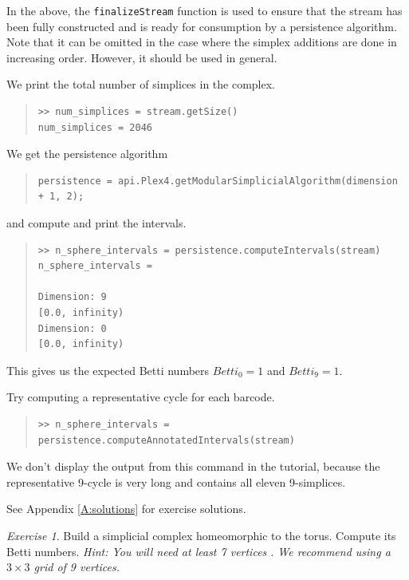 \documentclass[amscd, amssymb, verbatim]{amsart}[12pt]
\theoremstyle{remark}
\newtheorem{exercise}{Exercise}
\theoremstyle{remark}
\theoremstyle{remark}
\begin{document}
In the above, the \texttt{finalizeStream} function is used to ensure that the stream has been fully constructed and is ready for consumption by a persistence algorithm. Note that it can be omitted in the case where the simplex additions are done in increasing order. However, it should be used in general. 

We print the total number of simplices in the complex.

\begin{quote} \begin{verbatim}
>> num_simplices = stream.getSize()
num_simplices = 2046
\end{verbatim} \end{quote}

We get the persistence algorithm

\begin{quote} \begin{verbatim}
persistence = api.Plex4.getModularSimplicialAlgorithm(dimension + 1, 2);
\end{verbatim} \end{quote}

and compute and print the intervals.

\begin{quote} \begin{verbatim}
>> n_sphere_intervals = persistence.computeIntervals(stream)
n_sphere_intervals =

Dimension: 9
[0.0, infinity)
Dimension: 0
[0.0, infinity)
\end{verbatim} \end{quote}

This gives us the expected Betti numbers $Betti_0=1$ and $Betti_9=1$.

Try computing a representative cycle for each barcode.

\begin{quote} \begin{verbatim}
>> n_sphere_intervals = persistence.computeAnnotatedIntervals(stream)
\end{verbatim} \end{quote}

We don't display the output from this command in the tutorial, because the representative 9-cycle is very long and contains all eleven 9-simplices.

See Appendix \ref{A:solutions} for exercise solutions. 

\begin{exercise}
Build a simplicial complex homeomorphic to the torus. Compute its Betti numbers. {\em Hint: You will need at least 7 vertices} \citep[page 107]{Hatcher}{\em . We recommend using a $3\times 3$ grid of 9 vertices.} 
\end{exercise}
\end{document}
